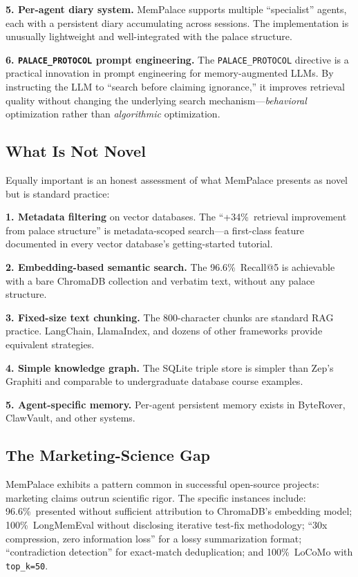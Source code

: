 \documentclass[twoside,11pt]{article}
\begin{document}
\textbf{5. Per-agent diary system.}  MemPalace supports multiple ``specialist''
agents, each with a persistent diary accumulating across sessions.  The
implementation is unusually lightweight and well-integrated with the palace
structure.

\textbf{6. \texttt{PALACE\_PROTOCOL} prompt engineering.}  The
\texttt{PALACE\_PROTOCOL} directive is a practical innovation in prompt
engineering for memory-augmented LLMs.  By instructing the LLM to ``search
before claiming ignorance,'' it improves retrieval quality without changing the
underlying search mechanism---\emph{behavioral} optimization rather than
\emph{algorithmic} optimization.

\subsection{What Is Not Novel}

Equally important is an honest assessment of what MemPalace presents as novel
but is standard practice:

\textbf{1. Metadata filtering} on vector databases.  The ``+34\%\ retrieval
improvement from palace structure'' is metadata-scoped search---a first-class
feature documented in every vector database's getting-started tutorial.

\textbf{2. Embedding-based semantic search.}  The 96.6\%\ Recall@5 is
achievable with a bare ChromaDB collection and verbatim text, without any
palace structure.

\textbf{3. Fixed-size text chunking.}  The 800-character chunks are standard
RAG practice.  LangChain, LlamaIndex, and dozens of other frameworks provide
equivalent strategies.

\textbf{4. Simple knowledge graph.}  The SQLite triple store is simpler than
Zep's Graphiti and comparable to undergraduate database course examples.

\textbf{5. Agent-specific memory.}  Per-agent persistent memory exists in
ByteRover, ClawVault, and other systems.

\subsection{The Marketing-Science Gap}

MemPalace exhibits a pattern common in successful open-source projects:
marketing claims outrun scientific rigor.  The specific instances include:
96.6\%\ presented without sufficient attribution to ChromaDB's embedding
model; 100\%\ LongMemEval without disclosing iterative test-fix methodology;
``30x compression, zero information loss'' for a lossy summarization format;
``contradiction detection'' for exact-match deduplication; and 100\%\ LoCoMo
with \texttt{top\_k=50}.
\end{document}
